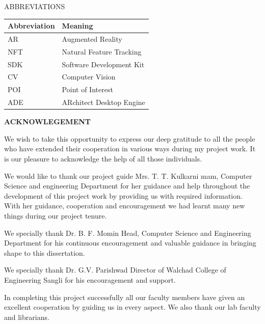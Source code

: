\documentclass{article}
\begin{document}




\newpage
{
\tableofcontents
}
\newpage
\listoffigures



\newpage
\begin{center}
	\LARGE ABBREVIATIONS
\end{center}

\renewcommand\arraystretch{1.3}
\renewcommand\tabcolsep{1cm}


\begin{tabular}{| l | l |}
	\hline
	Abbreviation & Meaning\\
	\hline
	AR & Augmented Reality\\
	NFT & Natural Feature Tracking\\
	SDK & Software Development Kit\\
	CV & Computer Vision\\
	POI & Point of Interest\\
	ADE & ARchitect Desktop Engine\\
	\hline
\end{tabular}





\newpage
\begin{center}
{\LARGE \textbf{ ACKNOWLEGEMENT}}\\[1cm]
\end{center}
{\Large
	\par We wish to take this opportunity to express our deep gratitude to all the people who have 
extended their cooperation in various ways during my project work. It is our pleasure to acknowledge 
the help of all those individuals. 
	\par We would like to thank our project guide Mrs. T. T. Kulkarni mam, Computer Science and 
engineering Department for her guidance and help throughout the development of this project work 
by providing us with required information. With her guidance, cooperation and encouragement we 
had learnt many new things during our project tenure. 
	\par We specially thank Dr. B. F. Momin Head, Computer Science and Engineering Department for 
his continuous encouragement and valuable guidance in bringing shape to this dissertation. 
	\par  We specially thank Dr. G.V. Parishwad Director of Walchad College of Engineering Sangli for 
his encouragement and support.  
	\par In completing this project successfully all our faculty members have given an excellent 
cooperation by guiding us in every aspect. We also thank our lab faculty and librarians.
}\\[1cm]
\vfill
\end{document}
